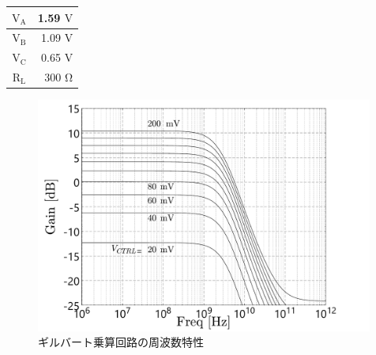 \begin{table}[!b]
\begin{minipage}[t]{.45\textwidth}
\begin{center}
\begin{tabular}{c|c|r}
                            \multicolumn{2}{c|}{$\mathrm{V_{A}}$} &   1.59 $\mathrm{V}$   \\
                            \hline
                            \multicolumn{2}{c|}{$\mathrm{V_{B}}$} &   1.09 $\mathrm{V}$   \\
                            \hline
                            \multicolumn{2}{c|}{$\mathrm{V_{C}}$} &   0.65 $\mathrm{V}$   \\
                            \hline
                            \multicolumn{2}{c|}{$\mathrm{R_{L}}$} &   300 $\mathrm{\Omega}$   \\
                            \hline
                    \end{tabular}
                \end{center}
            \end{minipage}
        \end{table}
        \begin{figure}[!b]
            \centering
            \includegraphics[width=0.99\textwidth]{figures/chapter3/previous_ac.pdf}
            \caption{ギルバート乗算回路の周波数特性}
            \label{fig:3_gilbert_ac}
        \end{figure}
